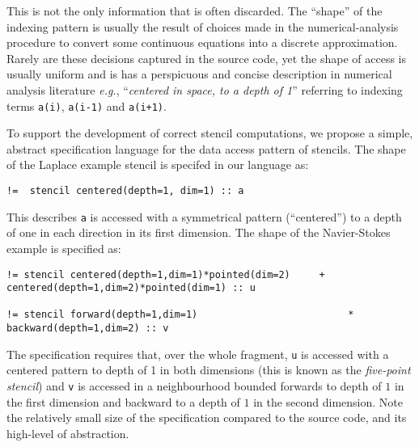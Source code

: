 \documentclass[10pt,preprint,numbers]{sigplanconf}
\theoremstyle{definition}
\newcommand{\eg}{\emph{e.g.}}
\begin{document}
This is not the only information that is often discarded. The
``shape'' of the indexing pattern is usually the result of choices made in the
numerical-analysis procedure to convert some
continuous equations into a discrete approximation. Rarely are these
decisions captured in the source code, yet the shape of access is
usually uniform and is has a perspicuous and concise description in
numerical analysis literature \eg{}, ``\emph{centered in space, to a
  depth of 1}'' referring to indexing terms \texttt{a(i)},
\texttt{a(i-1)} and \texttt{a(i+1)}.

To support the development of correct stencil computations, we propose
a simple, abstract specification language for the data access pattern
of stencils. The shape of the
Laplace example stencil is specifed in our language as:
%
\begin{verbatim}
!=  stencil centered(depth=1, dim=1) :: a
\end{verbatim}
%
This describes \texttt{a} is accessed with a symmetrical pattern
(``centered'') to a depth of one in each direction in its first
dimension.  The shape of the Navier-Stokes example
is specified as:
%
\begin{verbatim}
!= stencil centered(depth=1,dim=1)*pointed(dim=2)     + centered(depth=1,dim=2)*pointed(dim=1) :: u

!= stencil forward(depth=1,dim=1)                          * backward(depth=1,dim=2) :: v
\end{verbatim}
%
The specification requires that, over the whole fragment, \texttt{u}
is accessed with a centered pattern to depth of 1 in both dimensions
(this is known as the \emph{five-point stencil}) and \texttt{v} is
accessed in a neighbourhood bounded forwards to depth of $1$ in the
first dimension and backward to a depth of $1$ in the second
dimension. Note the relatively small size of the specification
compared to the source code, and its high-level of abstraction.
\end{document}

